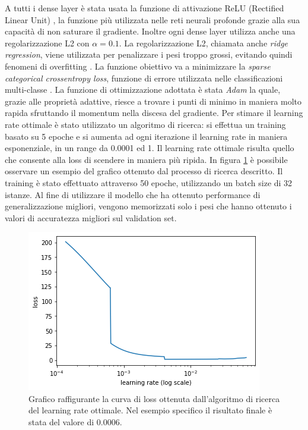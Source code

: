 \documentclass[11pt]{report}
\begin{document}
A tutti i dense layer è stata usata la funzione di attivazione ReLU (Rectified Linear Unit) \cite{relu}, la funzione più utilizzata nelle reti neurali profonde grazie alla sua capacità di non saturare il gradiente. Inoltre ogni dense layer utilizza anche una regolarizzazione L2 con $\alpha = 0.1$. La regolarizzazione L2, chiamata anche \textit{ridge regression}, viene utilizzata per penalizzare i pesi troppo grossi, evitando quindi fenomeni di overfitting \cite{l1l2}. La funzione obiettivo va a minimizzare la \textit{sparse categorical crossentropy loss}, funzione di errore utilizzata nelle classificazioni multi-classe \cite{loss}.
La funzione di ottimizzazione adottata è stata \textit{Adam} \cite{kingma2014adam} la quale, grazie alle proprietà adattive, riesce a trovare i punti di minimo in maniera molto rapida sfruttando il momentum nella discesa del gradiente. Per stimare il learning rate ottimale è stato utilizzato un algoritmo di ricerca: si effettua un training basato su 5 epoche e si aumenta ad ogni iterazione il learning rate in maniera esponenziale, in un range da 0.0001 ed 1. Il learning rate ottimale risulta quello che consente alla loss di scendere in maniera più ripida. In figura \ref{fig:lr-find} è possibile osservare un esempio del grafico ottenuto dal processo di ricerca descritto. Il training è stato effettuato attraverso 50 epoche, utilizzando un batch size di 32 istanze. Al fine di utilizzare il modello che ha ottenuto performance di generalizzazione migliori, vengono memorizzati solo i pesi che hanno ottenuto i valori di accuratezza migliori sul validation set. 



\begin{figure}[h]
    \centering
    \includegraphics[scale=0.65]{img/lr-finder.png}
    \caption{Grafico raffigurante la curva di loss ottenuta dall'algoritmo di ricerca del learning rate ottimale. Nel esempio specifico il risultato finale è stata del valore di 0.0006.}
    \label{fig:lr-find}
\end{figure}
\end{document}
